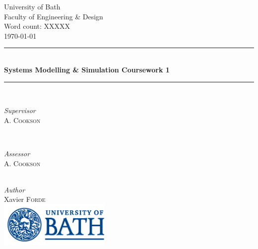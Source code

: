 \documentclass[11pt]{article}
\begin{document}
 

	\begin{titlepage}
	\thispagestyle{empty}
		\newcommand{\HRule}{\rule{\linewidth}{0.5mm}}	
		\center
		\LARGE 
		University of Bath\\
	 	Faculty of Engineering \& Design\\[1cm]	
		\large
		Word count: XXXXX\\[0.5cm]
		{\large\today}\\[1cm]	
		\HRule\\[0.4cm]	
		{\huge\bfseries Systems Modelling \& Simulation Coursework 1}\\[0.4cm] 	
		\HRule\\[1cm]	
		\begin{minipage}{0.4\textwidth}
			\begin{flushleft}
				\large
				\textit{Supervisor}\\
				A. \textsc{Cookson}
			\end{flushleft}
		\end{minipage}
		~
		\begin{minipage}{0.4\textwidth}
			\begin{flushright}
				\large
				\textit{Assessor}\\
				A. \textsc{Cookson} 
			\end{flushright}
		\end{minipage}\\[1.4cm]
		\large
		\textit{Author}\\
		Xavier \textsc{Forde}\\
		\vfill
		\includegraphics[width=0.4\textwidth]{UOB_Logo.png}\\
		\vfill 
	\end{titlepage}




\thispagestyle{empty}




\tableofcontents
\thispagestyle{empty}
\listoffigures


\end{document}
